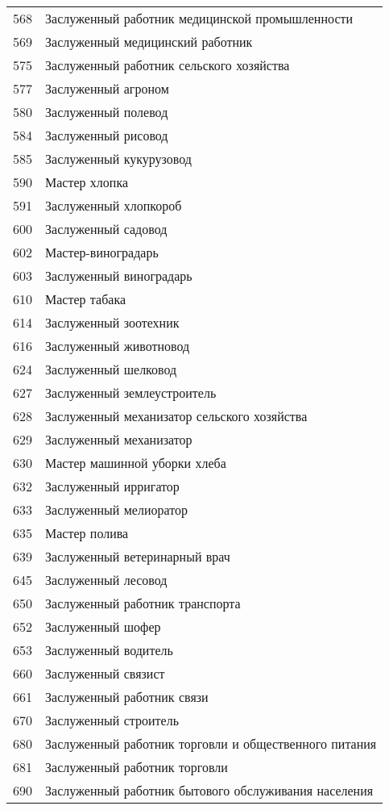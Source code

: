 \documentclass[10pt, a4paper, titlepage]{article}
\begin{document}
\begin{xtabular}{rp{.38\textwidth}}
    568 & Заслуженный работник медицинской промышленности \\
    569 & Заслуженный медицинский работник \\
    575 & Заслуженный работник сельского хозяйства \\
    577 & Заслуженный агроном \\
    580 & Заслуженный полевод \\
    584 & Заслуженный рисовод \\
    585 & Заслуженный кукурузовод \\
    590 & Мастер хлопка \\
    591 & Заслуженный хлопкороб \\
    600 & Заслуженный садовод \\
    602 & Мастер-виноградарь \\
    603 & Заслуженный виноградарь \\
    610 & Мастер табака \\
    614 & Заслуженный зоотехник \\
    616 & Заслуженный животновод \\
    624 & Заслуженный шелковод \\
    627 & Заслуженный землеустроитель \\
    628 & Заслуженный механизатор сельского хозяйства \\
    629 & Заслуженный механизатор \\
    630 & Мастер машинной уборки хлеба \\
    632 & Заслуженный ирригатор \\
    633 & Заслуженный мелиоратор \\
    635 & Мастер полива \\
    639 & Заслуженный ветеринарный врач \\
    645 & Заслуженный лесовод \\
    650 & Заслуженный работник транспорта \\
    652 & Заслуженный шофер \\
    653 & Заслуженный водитель \\
    660 & Заслуженный связист \\
    661 & Заслуженный работник связи \\
    670 & Заслуженный строитель \\
    680 & Заслуженный работник торговли и общественного питания \\
    681 & Заслуженный работник торговли \\
    690 & Заслуженный работник бытового обслуживания населения \\

\end{xtabular}
\end{document}
